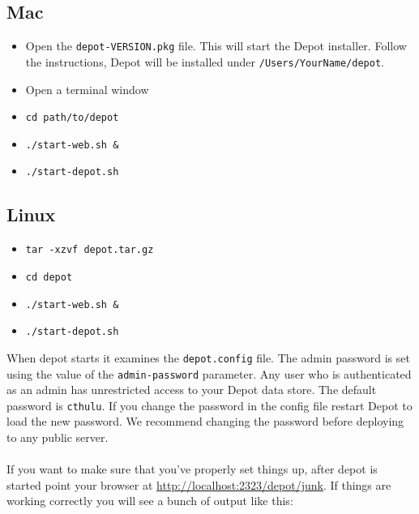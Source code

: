\documentclass{report}
\begin{document}
\subsection {Mac}
\begin{itemize}
\item Open the \texttt{depot-VERSION.pkg} file. This will start the
  Depot installer. Follow the instructions, Depot will be installed
  under \texttt{/Users/YourName/depot}.
\item Open a terminal window
\item \texttt{cd path/to/depot}
\item \texttt{./start-web.sh \&}
\item \texttt{./start-depot.sh}
\end{itemize}

\subsection{Linux}
\begin{itemize}
\item \texttt{tar -xzvf depot.tar.gz}
\item \texttt{cd depot}
\item \texttt{./start-web.sh \&}
\item \texttt{./start-depot.sh}
\end{itemize}

When depot starts it examines the \texttt{depot.config}
file. The admin password is set using the value of the
\texttt{admin-password} parameter. Any user who is authenticated 
as an admin has unrestricted access to your Depot data store.
The default password is \texttt{cthulu}. If you change the password
in the config file restart Depot to load the new password.
We recommend changing the password before deploying to any public server.

\paragraph{}
If you want to make sure that you've properly set things up, after
depot is started point your browser at
\url{http://localhost:2323/depot/junk}. If things are working
correctly you will see a bunch of output like this:
\end{document}
